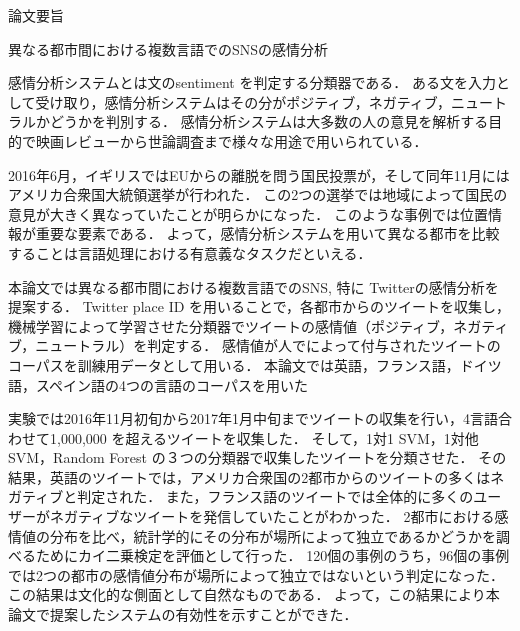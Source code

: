 \thispagestyle{empty}
\vspace*{2.0cm}

\begin{center}
\LARGE{論文要旨}
\end{center}
\vspace*{3mm}

\begin{center}
\LARGE{異なる都市間における複数言語でのSNSの感情分析}
\end{center}

\vspace{20mm}
\setlength\parindent{2zw}

感情分析システムとは文のsentiment を判定する分類器である．
ある文を入力として受け取り，感情分析システムはその分がポジティブ，ネガティブ，ニュートラルかどうかを判別する．
感情分析システムは大多数の人の意見を解析する目的で映画レビューから世論調査まで様々な用途で用いられている．

2016年6月，イギリスではEUからの離脱を問う国民投票が，そして同年11月にはアメリカ合衆国大統領選挙が行われた．
この2つの選挙では地域によって国民の意見が大きく異なっていたことが明らかになった．
このような事例では位置情報が重要な要素である．
よって，感情分析システムを用いて異なる都市を比較することは言語処理における有意義なタスクだといえる．

本論文では異なる都市間における複数言語でのSNS, 特に Twitterの感情分析を提案する．
Twitter place ID を用いることで，各都市からのツイートを収集し，機械学習によって学習させた分類器でツイートの感情値（ポジティブ，ネガティブ，ニュートラル）を判定する．
感情値が人でによって付与されたツイートのコーパスを訓練用データとして用いる．
本論文では英語，フランス語，ドイツ語，スペイン語の4つの言語のコーパスを用いた

実験では2016年11月初旬から2017年1月中旬までツイートの収集を行い，4言語合わせて1,000,000 を超えるツイートを収集した．
そして，1対1 SVM，1対他 SVM，Random Forest の３つの分類器で収集したツイートを分類させた．
その結果，英語のツイートでは，アメリカ合衆国の2都市からのツイートの多くはネガティブと判定された．
また，フランス語のツイートでは全体的に多くのユーザーがネガティブなツイートを発信していたことがわかった．
2都市における感情値の分布を比べ，統計学的にその分布が場所によって独立であるかどうかを調べるためにカイ二乗検定を評価として行った．
120個の事例のうち，96個の事例では2つの都市の感情値分布が場所によって独立ではないという判定になった．
この結果は文化的な側面として自然なものである．
よって，この結果により本論文で提案したシステムの有効性を示すことができた．

